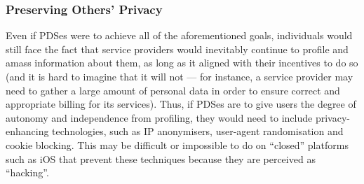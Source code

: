 \documentclass{acm_proc_article-sp}
\begin{document}
\subsubsection{Preserving Others' Privacy}
Even if PDSes were to achieve all of the aforementioned goals, individuals would still face the fact that service providers would inevitably continue to profile and amass information about them, as long as it aligned with their incentives to do so (and it is hard to imagine that it will not --- for instance, a service provider may need to gather a large amount of personal data in order to ensure correct and appropriate billing for its services). Thus, if PDSes are to give users the degree of autonomy and independence from profiling, they would need to include privacy-enhancing technologies, such as IP anonymisers, user-agent randomisation and cookie blocking. This may be difficult or impossible to do on ``closed'' platforms such as iOS that prevent these techniques because they are perceived as ``hacking''.

\end{document}
